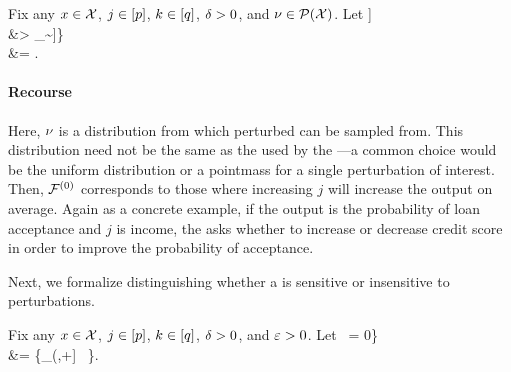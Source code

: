 \begin{definition}[Recourse]\label{defn:recourse}
Fix any $x\in\mathcal{X}$, $j\in[p]$, $k\in[q]$,
$\delta >0$, and
$\nu \in \mathcal{P}(\mathcal{X})$.
Let
\*[
    \modelspace\nullind
    &= \Big\{
    \model\in\modelspace\setdelim \EE_{\covobs\sim\covdistdum}\Big[\model(\covval\feat{[\covdim]\setminus\{j\}}, \covobs\feat{j})\feat{k} \condsym \covobs\feat{j} \in [\covval\feat{j}, \covval\feat{j}+\inscale]\Big] \\
    &\hspace{16mm}> \EE_{\covobs\sim\covdistdum}\Big[\model(\covval\feat{[\covdim]\setminus\{j\}}, \covobs\feat{j})\feat{k} \condsym \covobs\feat{j} \in[\covval\feat{j}-\inscale,\covval\feat{j}]\Big]\Big\} \\
    \modelspace\altind
    &= \modelspace \setminus \modelspace\nullind.
\]
\end{definition}

\paragraph{Recourse \intuitive{}}
Here, $\nu$ is a distribution from which perturbed \obsnames{} can be sampled from.
This distribution need not be the same as the \basename{} used by the \fielddefname{}---a common choice would be the uniform distribution or a pointmass for a single perturbation of interest.
Then, $\mathcal{F}^{(0)}$ corresponds to those \modelnames{} where increasing \covname{} $j$ will increase the \modelname{} output on average.
Again as a concrete example, if the \modelname{} output is the probability of loan acceptance and \covname{} $j$ is income, the \pracname{} asks whether to increase or decrease credit score in order to improve the probability of acceptance.

Next, we formalize distinguishing whether a \modelname{} is sensitive or insensitive to perturbations.
%

\begin{definition}\label{defn:spurious}
Fix any $x\in\mathcal{X}$, $j\in[p]$, $k\in[q]$,
$\delta >0$, and $\varepsilon>0$.
Let
 \, = 0\Big\} \\
    \modelspace\altind &= \Big\{\model\in\modelspace \setdelim \sup_{\covvaldum{}\in(\covval{},\covval{}+\inscale]}  \, \geq \outscale\Big\}.
\]
%
\end{definition}

